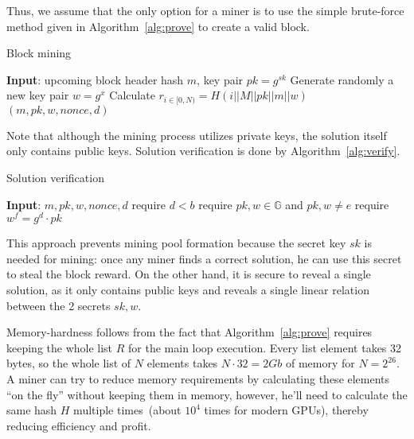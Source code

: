 Thus, we assume that the only option for a miner is to use the simple brute-force method given in Algorithm~\ref{alg:prove} to
create a valid block.

\begin{algorithm}[H]
    \caption{Block mining}
    \label{alg:prove}
    \begin{algorithmic}[1]
        \State \textbf{Input}: upcoming block header hash $m$, key pair $pk=g^{sk}$
        \State Generate randomly a new key pair $w=g^x$
        \State Calculate $r_{i \in [0,N)}=H(i||M||pk||m||w)$
        \State \Return $(m,pk,w,nonce,d)$
        \EndIf
        \EndWhile
    \end{algorithmic}
\end{algorithm}

Note that although the mining process utilizes private keys, the solution itself
only contains public keys. Solution verification is done by Algorithm~\ref{alg:verify}.

\begin{algorithm}[H]
    \caption{Solution verification}
    \label{alg:verify}
    \begin{algorithmic}[1]
        \State \textbf{Input}: $m,pk,w,nonce,d$
        \State require $d < b$
        \State require $pk,w\in \mathbb{G}$ and $pk,w \ne e$
        \State require $w^f = g^d \cdot pk$
    \end{algorithmic}
\end{algorithm}

This approach prevents mining pool formation because the secret key $sk$ is needed for mining: once any miner finds a correct solution, he can use this secret to steal the block reward. On the other hand, it is secure to reveal a single solution, as it only contains public keys and reveals a single linear relation between the 2 secrets $sk, w$.

Memory-hardness follows from the fact that Algorithm~\ref{alg:prove} requires keeping
the whole list $R$ for the main loop execution.
Every list element takes 32 bytes, so the whole list of $N$ elements
takes $N \cdot 32 = 2 Gb$ of memory for $N = 2^{26}$.
A miner can try to reduce memory requirements by calculating these elements ``on the fly''
without keeping them in memory, however, he'll need to calculate the same
hash $H$ multiple times~(about $10^4$ times for modern GPUs), thereby reducing efficiency and profit.

